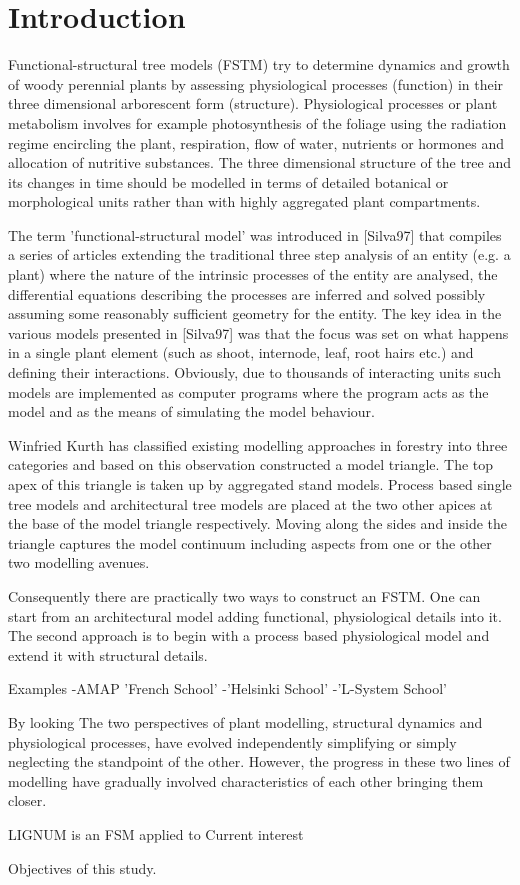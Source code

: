 \section{Introduction}

Functional-structural tree models (FSTM) try to determine dynamics and
growth of woody perennial  plants by assessing physiological processes
(function)  in their three  dimensional arborescent  form (structure).
Physiological  processes  or  plant  metabolism involves  for  example
photosynthesis of  the foliage  using the radiation  regime encircling
the  plant, respiration,  flow  of water,  nutrients  or hormones  and
allocation of  nutritive substances.  The  three dimensional structure
of the  tree and its  changes in time  should be modelled in  terms of
detailed  botanical or  morphological  units rather  than with  highly
aggregated plant compartments.

The  term 'functional-structural  model' was  introduced  in [Silva97]
that  compiles a series  of articles  extending the  traditional three
step analysis  of an entity  (e.g.  a plant)  where the nature  of the
intrinsic  processes  of the  entity  are  analysed, the  differential
equations describing  the processes  are inferred and  solved possibly
assuming some  reasonably sufficient geometry for the  entity. The key
idea in the  various models presented in [Silva97]  was that the focus
was set  on what  happens in  a single plant  element (such  as shoot,
internode, leaf,  root hairs  etc.)  and defining  their interactions.
Obviously,  due to  thousands  of interacting  units  such models  are
implemented as computer  programs where the program acts  as the model
and as the means of simulating the model behaviour.

Winfried  Kurth  has   classified  existing  modelling  approaches  in
forestry  into   three  categories  and  based   on  this  observation
constructed a model triangle.  The  top apex of this triangle is taken
up by aggregated  stand models.  Process based single  tree models and
architectural tree  models are placed at  the two other  apices at the
base of the  model triangle respectively.  Moving along  the sides and
inside  the triangle  captures the  model continuum  including aspects
from one or the other two modelling avenues.

Consequently there are practically two  ways to construct an FSTM. One
can start from an architectural model adding functional, physiological
details into it.  The second approach is to begin with a process based
physiological model and extend it with structural details.

Examples
-AMAP 'French School'
-'Helsinki School'
-'L-System School'

By  looking  The  two  perspectives  of  plant  modelling,  structural
dynamics  and  physiological  processes,  have  evolved  independently
simplifying  or  simply  neglecting   the  standpoint  of  the  other.
However, the progress  in these two lines of  modelling have gradually
involved characteristics of each other bringing them closer.



LIGNUM is an FSM applied to 
Current interest

Objectives of this study.
 

